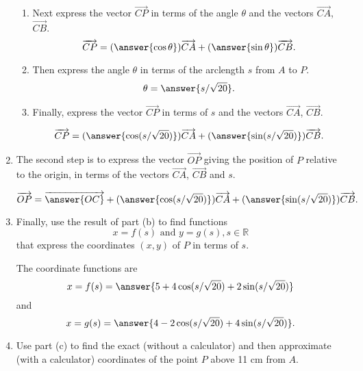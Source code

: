 \documentclass{ximera}
\begin{document}
\begin{question}
\begin{expandable}
\begin{enumerate}
\begin{enumerate}
\item Next express the vector $\overrightarrow{CP}$ in terms of the angle $\theta$ and the vectors $\overrightarrow{CA}$, $\overrightarrow{CB}$.
\[
       \overrightarrow{CP} = (\answer{\cos \theta}) \overrightarrow{CA} + (\answer{\sin \theta}) \overrightarrow{CB} .
\]

\item Then express the angle $\theta$ in terms of the arclength $s$ from $A$ to $P$.
\[
     \theta  =\answer{s/\sqrt{20}} .
\]

\item Finally, express  the vector $\overrightarrow{CP}$ in terms of $s$ and the vectors $\overrightarrow{CA}$, $\overrightarrow{CB}$.

\[
       \overrightarrow{CP} = (\answer{\cos (s/\sqrt{20})}) \overrightarrow{CA} + (\answer{\sin (s/\sqrt{20})}) \overrightarrow{CB} .
\]
\end{enumerate}

\item The second step is to express the vector  $\overrightarrow{OP}$ giving the position of $P$ relative to the origin, in terms of
the vectors $\overrightarrow{CA}$, $\overrightarrow{CB}$ and $s$.

\[
  \overrightarrow{OP} = \overrightarrow{\answer{OC}} +  (\answer{\cos (s/\sqrt{20})}) \overrightarrow{CA} + (\answer{\sin (s/\sqrt{20})}) \overrightarrow{CB} .
\]

\item Finally, use the result of part (b) to find functions
\[
    x = f(s) \text{ and } y=g(s) , s\in \mathbb{R}
\]
that express the coordinates $(x,y)$ of $P$ in terms of $s$.

The coordinate functions are
\[
    x = f(s) = \answer{5 + 4\cos (s/\sqrt{20}) +2\sin (s/\sqrt{20}) }
\]
and
\[
  x = g(s) = \answer{4 - 2\cos (s/\sqrt{20}) +4\sin (s/\sqrt{20}) } .
\]

\item Use part (c) to find the exact (without a calculator) and then approximate (with a calculator) coordinates of the point $P$ above 11 cm from $A$. 
\end{enumerate}

\end{expandable}

\end{question}
\end{document}
